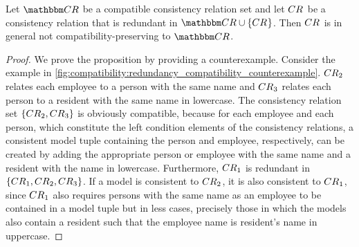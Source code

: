 \begin{proposition} \label{prop:redundantnotimpliescompatible}
    Let $\consistencyrelationset{CR}$ be a compatible consistency relation set and let $\consistencyrelation{CR}{}$ be a consistency relation that is redundant in $\consistencyrelationset{CR} \cup \setted{\consistencyrelation{CR}{}}$.
    Then $\consistencyrelation{CR}{}$ is in general not compatibility-preserving to $\consistencyrelationset{CR}$.
\end{proposition}
%
\begin{proof}
We prove the proposition by providing a counterexample.
Consider the example in \autoref{fig:compatibility:redundancy_compatibility_counterexample}. 
$\consistencyrelation{CR}{2}$ relates each employee to a person with the same name and $\consistencyrelation{CR}{3}$ relates each person to a resident with the same name in lowercase.
The consistency relation set $\setted{\consistencyrelation{CR}{2}, \consistencyrelation{CR}{3}}$ is obviously compatible, because for each employee and each person, which constitute the left condition elements of the consistency relations, a consistent model tuple containing the person and employee, respectively, can be created by adding the appropriate person or employee with the same name and a resident with the name in lowercase.
Furthermore, $\consistencyrelation{CR}{1}$ is redundant in $\setted{\consistencyrelation{CR}{1}, \consistencyrelation{CR}{2}, \consistencyrelation{CR}{3}}$.
If a model is consistent to $\consistencyrelation{CR}{2}$, it is also consistent to $\consistencyrelation{CR}{1}$, since $\consistencyrelation{CR}{1}$ also requires persons with the same name as an employee to be contained in a model tuple but in less cases, precisely those in which the models also contain a resident such that the employee name is resident's name in uppercase.


\end{proof}
